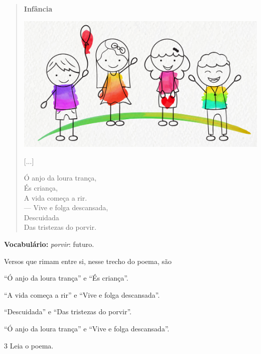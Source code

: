 \begin{myquote}
\begin{verse}
\textbf{Infância}

\begin{center}
\includegraphics[width=.7\textwidth]{./media/image17b.jpeg}
\end{center}

{[}...{]}

Ó anjo da loura trança,\\
És criança,\\
A vida começa a rir.\\
--- Vive e folga descansada,\\
Descuidada\\
Das tristezas do porvir.
\end{verse}


\begin{small}
\textbf{Vocabulário:} \textit{porvir}: futuro.
\end{small}
\end{myquote}

Versos que rimam entre si, nesse trecho do poema, são

\begin{escolha}[itemsep=-5pt]
\item ``Ó anjo da loura trança'' e ``És criança''.

\item ``A vida começa a rir'' e ``Vive e folga descansada''.

\item ``Descuidada'' e ``Das tristezas do porvir''.

\item ``Ó anjo da loura trança'' e ``Vive e folga descansada''.
\end{escolha}

\num{3} Leia o poema.

